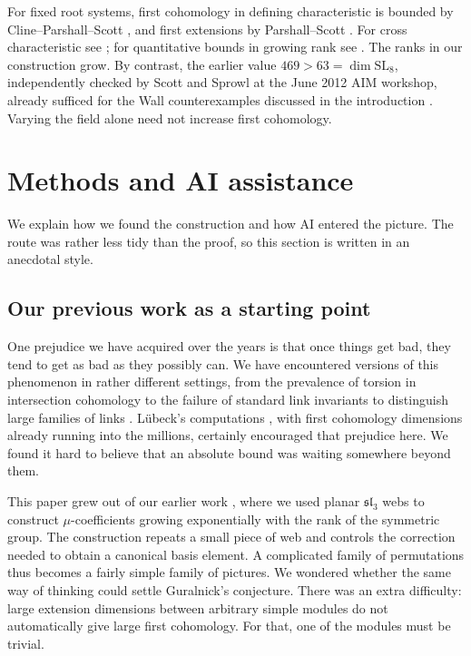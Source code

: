 \documentclass[a4paper,11pt]{amsart}
\numberwithin{equation}{subsection}
\theoremstyle{plain}
\theoremstyle{definition}
\theoremstyle{remark}
\begin{document}
For fixed root systems, first cohomology in defining
characteristic is bounded by Cline--Parshall--Scott \cite{CPS},
and first extensions by Parshall--Scott \cite{ParshallScott}.
For cross characteristic see \cite{GuralnickTiep,GuralnickTiepSectional};
for quantitative bounds in growing rank see \cite{ParkerStewart}.
The ranks in our construction grow. By contrast, the earlier
value $469>63=\dim\mathrm{SL}_8$, independently checked by Scott
and Sprowl at the June 2012 AIM workshop, already sufficed for
the Wall counterexamples discussed in the introduction
\cite{AIMWall,Luebeck}. Varying the field alone need not increase
first cohomology.

\section{Methods and AI assistance}

We explain how we found the construction and how AI entered the picture. The route was rather less tidy than the proof, so this section is written in an anecdotal style.

\subsection{Our previous work as a starting point}

One prejudice we have acquired over the years is that once
things get bad, they tend to get as bad as they possibly can.
We have encountered versions of this phenomenon in rather
different settings, from the prevalence of torsion in
intersection cohomology \cite{TorsionProliferation} to the
failure of standard link invariants to distinguish large
families of links \cite{LinkDetection}.
L\"ubeck's computations \cite{Luebeck}, with first cohomology
dimensions already running into the millions, certainly
encouraged that prejudice here. We found it hard to believe
that an absolute bound was waiting somewhere beyond them.

This paper grew out of our earlier work \cite{Finite}, where
we used planar $\mathfrak{sl}_3$ webs to construct
$\mu$-coefficients growing exponentially with the rank of
the symmetric group. The construction repeats a small piece
of web and controls the correction needed to obtain a
canonical basis element. A complicated family of permutations
thus becomes a fairly simple family of pictures.
We wondered whether the same way of thinking could settle
Guralnick's conjecture. There was an extra difficulty:
large extension dimensions between arbitrary simple modules
do not automatically give large first cohomology. For that,
one of the modules must be trivial.
\end{document}
